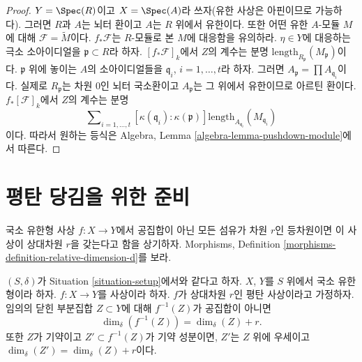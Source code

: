 \begin{proof}
\medskip\noindent
$Y = \Spec(R)$이고 $X = \Spec(A)$라 쓰자(유한 사상은 아핀이므로
가능하다). 그러면 $R$과 $A$는 뇌터 환이고 $A$는 $R$ 위에서 유한이다.
또한 어떤 유한 $A$-모듈 $M$에 대해
$\mathcal{F} = \widetilde{M}$이다. $f_*\mathcal{F}$는 $R$-모듈로 본
$M$에 대응함을 유의하라. $\eta \in Y$에 대응하는 극소 소아이디얼을
$\mathfrak p \subset R$라 하자. $[f_*\mathcal{F}]_k$에서 $Z$의 계수는
분명 $\text{length}_{R_{\mathfrak p}}(M_{\mathfrak p})$이다.
$\mathfrak p$ 위에 놓이는 $A$의 소아이디얼들을
$\mathfrak q_i$, $i = 1, \ldots, t$라 하자. 그러면
$A_{\mathfrak p} = \prod A_{\mathfrak q_i}$이다. 실제로
$R_{\mathfrak p}$는 차원 0인 뇌터 국소환이고 $A_{\mathfrak p}$는 그
위에서 유한이므로 아르틴 환이다. $f_*[\mathcal{F}]_k$에서 $Z$의 계수는
분명
$$
\sum\nolimits_{i = 1, \ldots, t}
[\kappa(\mathfrak q_i) : \kappa(\mathfrak p)]
\text{length}_{A_{\mathfrak q_i}}(M_{\mathfrak q_i})
$$
이다. 따라서 원하는 등식은 Algebra, Lemma
\ref{algebra-lemma-pushdown-module}에서 따른다.
\end{proof}




















\section{평탄 당김을 위한 준비}
\label{section-preparation-flat-pullback}


\noindent
국소 유한형 사상 $f : X \to Y$에서 공집합이 아닌 모든 섬유가 차원
$r$인 등차원이면 이 사상이 상대차원 $r$을 갖는다고 함을 상기하자.
Morphisms, Definition \ref{morphisms-definition-relative-dimension-d}를 보라.

\begin{lemma}
\label{lemma-flat-inverse-image-dimension}
$(S, \delta)$가 Situation \ref{situation-setup}에서와 같다고 하자.
$X$, $Y$를 $S$ 위에서 국소 유한형이라 하자.
$f : X \to Y$를 사상이라 하자.
$f$가 상대차원 $r$인 평탄 사상이라고 가정하자.
임의의 닫힌 부분집합 $Z \subset Y$에 대해 $f^{-1}(Z)$가 공집합이
아니면
$$
\dim_\delta(f^{-1}(Z)) = \dim_\delta(Z) + r.
$$
또한 $Z$가 기약이고 $Z' \subset f^{-1}(Z)$가 기약 성분이면,
$Z'$는 $Z$ 위에 우세이고
$\dim_\delta(Z') = \dim_\delta(Z) + r$이다.
\end{lemma}

